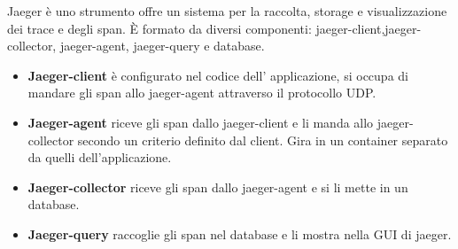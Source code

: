 \documentclass[a4paper,12pt,titlepage,italian,openany]{report}
\begin{document}
Jaeger\cite{jaeger:1} è uno strumento offre un sistema per la raccolta, storage e visualizzazione dei trace e degli span.
È formato da diversi componenti: jaeger-client,jaeger-collector, jaeger-agent, jaeger-query e database.
\begin{itemize}
    \item{\textbf{Jaeger-client}} è configurato nel codice dell' applicazione, si occupa di mandare gli span allo jaeger-agent attraverso il protocollo UDP.
    \item {\textbf{Jaeger-agent}} riceve gli span dallo jaeger-client e li manda allo jaeger-collector secondo un criterio definito dal client. Gira in un container separato da quelli dell'applicazione.
    \item {\textbf{Jaeger-collector}} riceve gli span dallo jaeger-agent e si li mette in un database.
    \item {\textbf{Jaeger-query}} raccoglie gli span nel database e li mostra nella GUI di jaeger.
\end{itemize}
\end{document}
